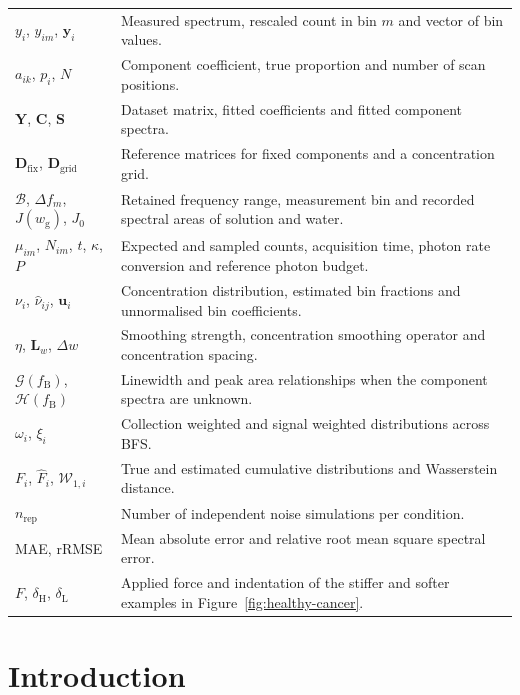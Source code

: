 \documentclass[11pt]{article}
\newcommand{\wg}{w_{\mathrm g}}
\begin{document}
\begin{longtable}{@{}p{}p{}@{}}
$y_i$, $y_{im}$, $\mathbf y_i$ & Measured spectrum, rescaled count in bin $m$ and vector of bin values. \\
$a_{ik}$, $p_i$, $N$ & Component coefficient, true proportion and number of scan positions. \\
$\mathbf Y$, $\mathbf C$, $\mathbf S$ & Dataset matrix, fitted coefficients and fitted component spectra. \\
$\mathbf D_{\mathrm{fix}}$, $\mathbf D_{\mathrm{grid}}$ & Reference matrices for fixed components and a concentration grid. \\
$\mathcal B$, $\Delta f_m$, $J(\wg)$, $J_0$ & Retained frequency range, measurement bin and recorded spectral areas of solution and water. \\
$\mu_{im}$, $N_{im}$, $t$, $\kappa$, $P$ & Expected and sampled counts, acquisition time, photon rate conversion and reference photon budget. \\
$\nu_i$, $\widehat\nu_{ij}$, $\mathbf u_i$ & Concentration distribution, estimated bin fractions and unnormalised bin coefficients. \\
$\eta$, $\mathbf L_w$, $\Delta w$ & Smoothing strength, concentration smoothing operator and concentration spacing. \\
$\mathcal G(f_{\mathrm B})$, $\mathcal H(f_{\mathrm B})$ & Linewidth and peak area relationships when the component spectra are unknown. \\
$\omega_i$, $\xi_i$ & Collection weighted and signal weighted distributions across BFS. \\
$F_i$, $\widehat F_i$, $\mathcal W_{1,i}$ & True and estimated cumulative distributions and Wasserstein distance. \\
$n_{\mathrm{rep}}$ & Number of independent noise simulations per condition. \\
MAE, rRMSE & Mean absolute error and relative root mean square spectral error. \\
$F$, $\delta_{\mathrm H}$, $\delta_{\mathrm L}$ & Applied force and indentation of the stiffer and softer examples in Figure~\ref{fig:healthy-cancer}. \\
\bottomrule
\end{longtable}
\addtocounter{table}{-1}
\normalsize
\clearpage



\section{Introduction}
\label{sec:introduction}
\end{document}

